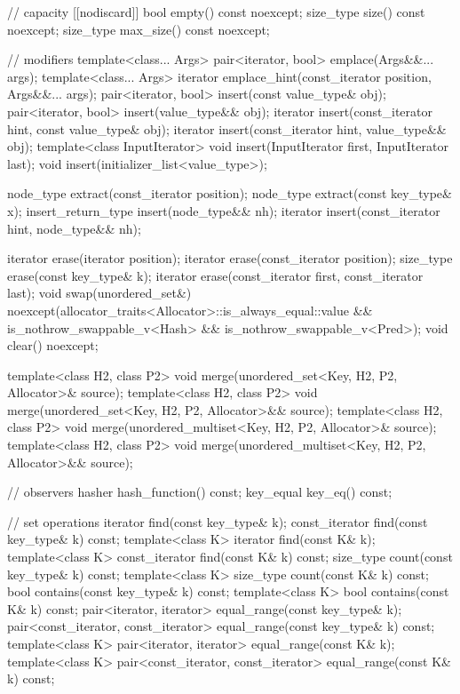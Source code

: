 \begin{codeblock}
{{    // capacity
    [[nodiscard]] bool empty() const noexcept;
    size_type size() const noexcept;
    size_type max_size() const noexcept;

    // modifiers
    template<class... Args> pair<iterator, bool> emplace(Args&&... args);
    template<class... Args> iterator emplace_hint(const_iterator position, Args&&... args);
    pair<iterator, bool> insert(const value_type& obj);
    pair<iterator, bool> insert(value_type&& obj);
    iterator insert(const_iterator hint, const value_type& obj);
    iterator insert(const_iterator hint, value_type&& obj);
    template<class InputIterator> void insert(InputIterator first, InputIterator last);
    void insert(initializer_list<value_type>);

    node_type extract(const_iterator position);
    node_type extract(const key_type& x);
    insert_return_type insert(node_type&& nh);
    iterator           insert(const_iterator hint, node_type&& nh);

    iterator  erase(iterator position);
    iterator  erase(const_iterator position);
    size_type erase(const key_type& k);
    iterator  erase(const_iterator first, const_iterator last);
    void      swap(unordered_set&)
      noexcept(allocator_traits<Allocator>::is_always_equal::value &&
               is_nothrow_swappable_v<Hash> &&
               is_nothrow_swappable_v<Pred>);
    void      clear() noexcept;

    template<class H2, class P2>
      void merge(unordered_set<Key, H2, P2, Allocator>& source);
    template<class H2, class P2>
      void merge(unordered_set<Key, H2, P2, Allocator>&& source);
    template<class H2, class P2>
      void merge(unordered_multiset<Key, H2, P2, Allocator>& source);
    template<class H2, class P2>
      void merge(unordered_multiset<Key, H2, P2, Allocator>&& source);

    // observers
    hasher hash_function() const;
    key_equal key_eq() const;

    // set operations
    iterator         find(const key_type& k);
    const_iterator   find(const key_type& k) const;
    template<class K>
      iterator       find(const K& k);
    template<class K>
      const_iterator find(const K& k) const;
    size_type        count(const key_type& k) const;
    template<class K>
      size_type      count(const K& k) const;
    bool             contains(const key_type& k) const;
    template<class K>
      bool           contains(const K& k) const;
    pair<iterator, iterator>               equal_range(const key_type& k);
    pair<const_iterator, const_iterator>   equal_range(const key_type& k) const;
    template<class K>
      pair<iterator, iterator>             equal_range(const K& k);
    template<class K>
      pair<const_iterator, const_iterator> equal_range(const K& k) const;

}}
\end{codeblock}

